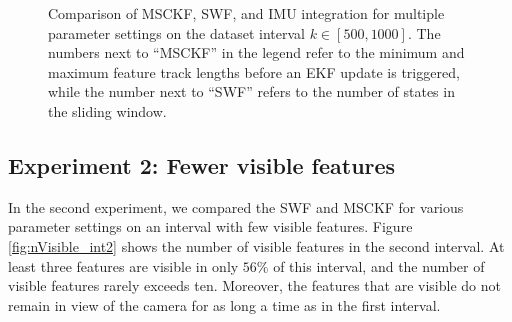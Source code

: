 \documentclass[letterpaper, 10 pt, conference]{ieeeconf}  %
\begin{document}
\begin{figure}
    \centering


    \caption{Comparison of MSCKF, SWF, and IMU integration for multiple parameter settings on the dataset interval $k\in[500,1000]$. The numbers next to ``MSCKF'' in the legend refer to the minimum and maximum feature track lengths before an EKF update is triggered, while the number next to ``SWF'' refers to the number of states in the sliding window.}
    \label{fig:comp_1}
\end{figure}


\subsection{Experiment 2: Fewer visible features}
In the second experiment, we compared the SWF and MSCKF for various parameter settings on an interval with few visible features.
Figure \ref{fig:nVisible_int2} shows the number of visible features in the second interval.
At least three features are visible in only $56\%$ of this interval, and the number of visible features rarely exceeds ten.
Moreover, the features that are visible do not remain in view of the camera for as long a time as in the first interval.
\end{document}
